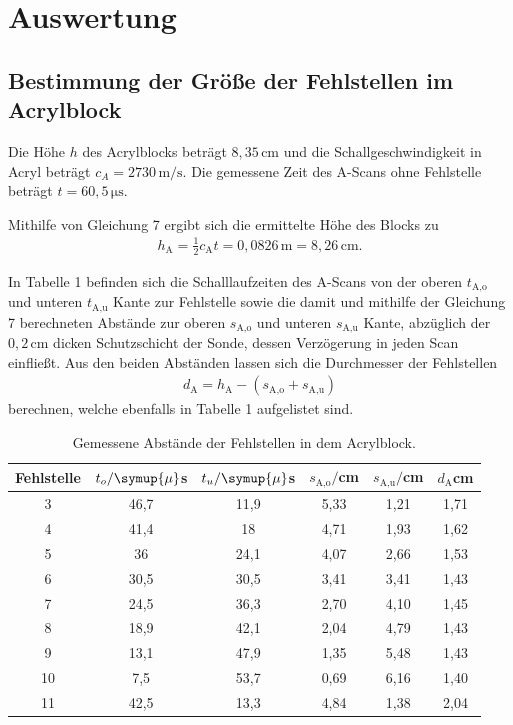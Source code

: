 \section{Auswertung}
\label{sec:Auswertung}

\subsection{Bestimmung der Größe der Fehlstellen im Acrylblock}

Die Höhe $h$ des Acrylblocks beträgt $8,35\,\si{\centi\meter}$ 
und die Schallgeschwindigkeit in Acryl beträgt $c_A=2730\,\si{\meter\per\second}$.
Die gemessene Zeit des A-Scans ohne Fehlstelle beträgt $t=60,5\,\si{\micro\second}$.

Mithilfe von Gleichung 7 ergibt sich die ermittelte Höhe des Blocks zu
\begin{align*}
h_\text{A} = \frac{1}{2} c_\text{A} t = 0,0826\,\si{\meter} = 8,26\,\si{\centi\meter}.
\end{align*}

In Tabelle 1 befinden sich die Schalllaufzeiten des A-Scans von der oberen $t_\text{A,o}$ 
und unteren $t_\text{A,u}$ Kante zur Fehlstelle sowie 
die damit und mithilfe der Gleichung 7 berechneten Abstände zur oberen $s_\text{A,o}$ und unteren
$s_\text{A,u}$ Kante, abzüglich der $0,2\,\si{\centi\meter}$ dicken Schutzschicht der Sonde, dessen
Verzögerung in jeden Scan einfließt. Aus den beiden Abständen 
lassen sich die Durchmesser der Fehlstellen 
\begin{align*}
d_\text{A} = h_\text{A} - (s_\text{A,o} + s_\text{A,u})
\end{align*}
berechnen, welche ebenfalls in Tabelle 1 aufgelistet sind.

\begin{table}[H]
  \centering
  \caption{Gemessene Abstände der Fehlstellen in dem Acrylblock.}
  \begin{tabular}{c c c c c c}
    \toprule
  Fehlstelle & $t_o/\symup{\mu}$s & $t_u/\symup{\mu}$s & $s_\text{A,o}/$cm & $s_\text{A,u}/$cm & $d_\text{A}$cm\\
    \midrule
    3  & 46,7 &  11,9  & 5,33 & 1,21  & 1,71  \\
    4  & 41,4 &  18    & 4,71 & 1,93  & 1,62  \\
    5  & 36   &  24,1  & 4,07 & 2,66  & 1,53  \\
    6  & 30,5 &  30,5  & 3,41 & 3,41  & 1,43  \\
    7  & 24,5 &  36,3  & 2,70 & 4,10  & 1,45  \\
    8  & 18,9 &  42,1  & 2,04 & 4,79  & 1,43  \\
    9  & 13,1 &  47,9  & 1,35 & 5,48  & 1,43  \\
    10 & 7,5  &  53,7  & 0,69 & 6,16  & 1,40  \\
    11 & 42,5 &  13,3  & 4,84 & 1,38  & 2,04  \\
    \bottomrule
  \end{tabular}
\end{table}

